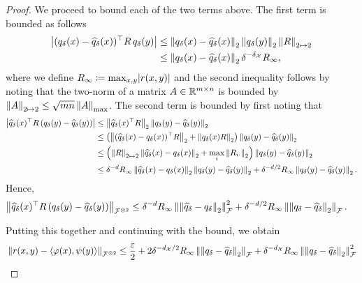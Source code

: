 \begin{proof}
    We proceed to bound each of the two terms above. The first term is bounded as follows
    \begin{align*}
        \abs{(q_\delta(x) - \hat{q}_\delta(x))^\top R\, q_\delta(y)} &\leq \twonorm{q_\delta(x) - \hat{q}_\delta(x)} \twonorm{q_\delta(y)} \norm{R}_{2 \mapsto 2}\\
        &\leq \twonorm{q_\delta(x) - \hat{q}_\delta(x)} \delta^{-\delta_\calX} R_\infty,
    \end{align*}
    where we define $R_\infty \coloneq \max_{x,y} \lvert r(x,y)\rvert$ and the second inequality follows by noting that the two-norm of a matrix $A \in\mathbb{R}^{m \times n}$ is bounded by $\left\lVert A\right\rVert_{2 \mapsto 2} \leq \sqrt{m n} \left\lVert A\right\rVert_{\max}$. The second term is bounded by first noting that
    \begin{align*}
        \abs{\hat{q}_\delta(x)^\top R\, (q_\delta(y) - \hat{q}_\delta(y))} &\leq \twonorm{\hat{q}_\delta(x)^\top R} \twonorm{q_\delta(y) - \hat{q}_\delta(y)} \\
        &\leq \paren{\twonorm{(\hat{q}_\delta(x) - q_\delta(x))^\top R} + \twonorm{q_\delta(x) R}} \twonorm{q_\delta(y) - \hat{q}_\delta(y)}\\
        &\leq \paren{\norm{R}_{2 \mapsto 2} \twonorm{\hat{q}_\delta(x) - q_\delta(x)}+ \max_i \twonorm{R_{i\cdot}}} \twonorm{q_\delta(y) - \hat{q}_\delta(y)}\\
        &\leq \delta^{-d} R_\infty \twonorm{\hat{q}_\delta(x) - q_\delta(x)} \twonorm{q_\delta(y) - \hat{q}_\delta(y)} + \delta^{-d / 2} R_\infty \twonorm{q_\delta(y) - \hat{q}_\delta(y)}.
    \end{align*}
    Hence,
    \begin{align*}
        \norm{\hat{q}_\delta(x)^\top R\, (q_\delta(y) - \hat{q}_\delta(y))}_{\calF^{\otimes 2}} &\leq  \delta^{-d} R_\infty \norm{\twonorm{\hat{q}_\delta - q_\delta}}_{\calF}^2 + \delta^{-d / 2} R_\infty \norm{\twonorm{q_\delta - \hat{q}_\delta}}_{\calF}.
    \end{align*}

    Putting this together and continuing with the bound, we obtain
    \begin{align*}
        &\norm{r(x,y) - \iprod{\phi(x)}{\psi(y)}}_{\calF^{\otimes 2}} \leq \frac{\epsilon}{2} + 2 \delta^{- d_{\calX} / 2} R_\infty \norm{\twonorm{q_\delta - \hat{q}_\delta}}_{\calF} + \delta^{- d_{\calX}} R_\infty \norm{\twonorm{q_\delta - \hat{q}_\delta}}_{\calF}^2\\
    \end{align*}


\end{proof}
